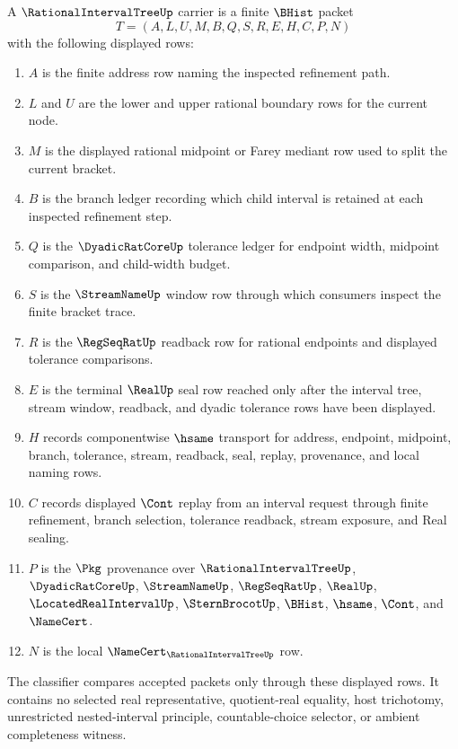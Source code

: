 \begin{definition}
\label{def:rational-interval-tree-carrier}
A $\RationalIntervalTreeUp$ carrier is a finite $\BHist$ packet
$$
T=(A,L,U,M,B,Q,S,R,E,H,C,P,N)
$$
with the following displayed rows:
\begin{enumerate}
\item $A$ is the finite address row naming the inspected refinement path.
\item $L$ and $U$ are the lower and upper rational boundary rows for the current node.
\item $M$ is the displayed rational midpoint or Farey mediant row used to split the current bracket.
\item $B$ is the branch ledger recording which child interval is retained at each inspected refinement step.
\item $Q$ is the $\DyadicRatCoreUp$ tolerance ledger for endpoint width, midpoint comparison, and child-width budget.
\item $S$ is the $\StreamNameUp$ window row through which consumers inspect the finite bracket trace.
\item $R$ is the $\RegSeqRatUp$ readback row for rational endpoints and displayed tolerance comparisons.
\item $E$ is the terminal $\RealUp$ seal row reached only after the interval tree, stream window, readback, and dyadic tolerance rows have been displayed.
\item $H$ records componentwise $\hsame$ transport for address, endpoint, midpoint, branch, tolerance, stream, readback, seal, replay, provenance, and local naming rows.
\item $C$ records displayed $\Cont$ replay from an interval request through finite refinement, branch selection, tolerance readback, stream exposure, and Real sealing.
\item $P$ is the $\Pkg$ provenance over $\RationalIntervalTreeUp$, $\DyadicRatCoreUp$, $\StreamNameUp$, $\RegSeqRatUp$, $\RealUp$, $\LocatedRealIntervalUp$, $\SternBrocotUp$, $\BHist$, $\hsame$, $\Cont$, and $\NameCert$.
\item $N$ is the local $\NameCert_{\RationalIntervalTreeUp}$ row.
\end{enumerate}
The classifier compares accepted packets only through these displayed rows. It contains no selected real representative, quotient-real equality, host trichotomy, unrestricted nested-interval principle, countable-choice selector, or ambient completeness witness.
\end{definition}

